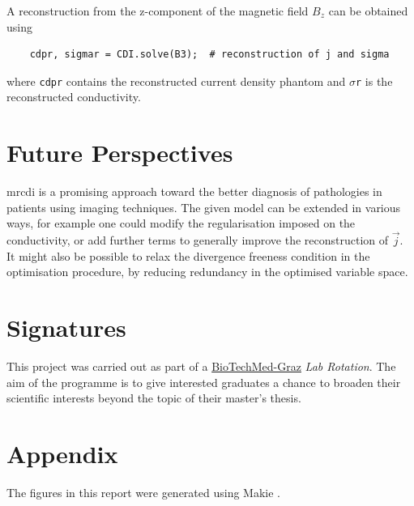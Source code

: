 \documentclass[10pt]{article}
\begin{document}
  A reconstruction from the z-component of the magnetic field $B_z$ can be obtained using
  \begin{verbatim}
    cdpr, sigmar = CDI.solve(B3);  # reconstruction of j and sigma
  \end{verbatim}
  where \texttt{cdpr} contains the reconstructed current density phantom and $\sigma$\texttt{r} is the reconstructed conductivity.

  \section{Future Perspectives}
  \gls{mrcdi} is a promising approach toward the better diagnosis of pathologies in patients using imaging techniques.
  The given model can be extended in various ways, for example one could modify the regularisation imposed on the conductivity, or add further terms to generally improve the reconstruction of $\vec{j}$.
  It might also be possible to relax the divergence freeness condition in the optimisation procedure, by reducing redundancy in the optimised variable space.

  \pagebreak

  \section*{Signatures}
  This project was carried out as part of a \href{https://biotechmedgraz.at}{BioTechMed-Graz} \textit{Lab Rotation}. The aim of the programme is to give interested graduates a chance to broaden their scientific interests beyond the topic of their master's thesis.

  \vspace{4.5cm}

  \vspace{3cm}

  \pagebreak
  \printbibliography
  \printnoidxglossary[type=acronym, title={Acronyms}]

  \pagebreak
  \appendix
  \section{Appendix}
  The figures in this report were generated using Makie \parencite{2021-makie}.

\end{document}
